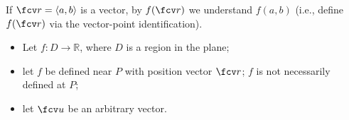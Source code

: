 \begin{frame}
If $\fcv r =\langle a,b \rangle$ is a vector, by $f(\fcv r) $ we understand $f(a,b) $ (i.e., define $f(\fcv r)$ via the vector-point identification).
\begin{definition}
\begin{itemize}
\item<2-> Let $f: D\to \mathbb R$, where $D$ is a region in the plane;
\item<3-> let  $f$ be defined near $P$ with position vector $\fcv r$; $f$ is not necessarily defined at $P$;
\item<4-> let $\fcv u$ be an arbitrary vector.
\end{itemize}
\end{definition}
\end{frame}